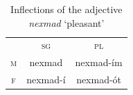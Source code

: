 {\begin{description}

   \begin{table}[t]
      \small
      \centering
       \setlength{\extrarowheight}{8pt}
      \begin{tabular}{ccc} 
 \toprule
 & \textsc{sg} & \textsc{pl} \\
\cmidrule{2-3}
    \textsc{m} & nexmad & nexmad-\'{i}m \\
   \textsc{f} &  nexmad-\'{i} & nexmad-\'{o}t \\
    \bottomrule
    \end{tabular}
    \caption{Inflections of the adjective \textit{nexmad} `pleasant'}
        \label{tab:non-y-adjs}
    \end{table}



\end{description}}
